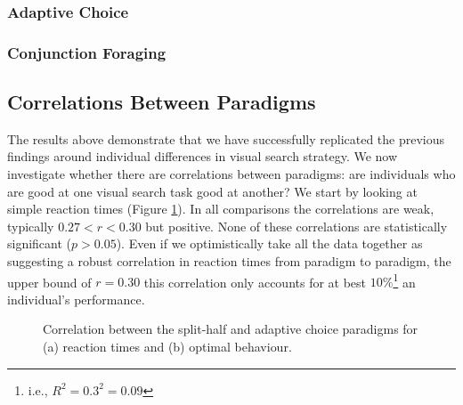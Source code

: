 \documentclass[]{rsos}%
\begin{document}
\subsubsection{Adaptive Choice}

\subsubsection{Conjunction Foraging}


\subsection{Correlations Between Paradigms}

The results above demonstrate that we have successfully replicated the previous findings around individual differences in visual search strategy. We now investigate whether there are correlations between paradigms: are individuals who are good at one visual search task good at another? We start by looking at simple reaction times (Figure \ref{fig:between_para_rt}). In all comparisons the correlations are weak, typically $0.27 < r <0.30$ but positive. None of these correlations are statistically significant ($p>0.05$). Even if we optimistically take all the data together as suggesting a robust correlation in reaction times from paradigm to paradigm, the upper bound of $r=0.30$ this correlation only accounts for at best $10\%$\footnote{i.e., $R^2 = 0.3^2 = 0.09$} an individual's performance. 

\begin{figure}
\centering
{}
\caption{Correlation between the split-half and adaptive choice paradigms for (a) reaction times and (b) optimal behaviour.}
\label{fig:between_para_rt}
\end{figure}
\end{document}
